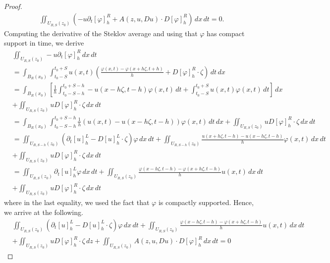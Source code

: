 \documentclass[10pt,a4paper]{amsart}
\numberwithin{equation}{section}
\begin{document}
\begin{proof}
\begin{align*}
&\iint_{U_{R, S}(z_0)}\left(-u\partial_{t}[\varphi]^R_{h}+A(z, u, Du)\cdot D[\varphi]^R_{h}\right)\, dx\, dt=0.
\end{align*}
Computing the derivative of the Steklov average and using that $\varphi$
has compact support in time, we derive
\begin{align*}
&\iint_{U_{R, S}(z_0)}-u\partial_{t}[\varphi]^R_{h} \,dx\, dt \\
& =\int_{B_{R}(x_0)}\int_{t_0-S}^{t_0+S}u(x,t)\left(\frac{\varphi(x,t)-\varphi(x+h\zeta,t+h)}{h}+D[\varphi]_{h}^{R}\cdot\zeta\right)\,dt\,dx\\
 & =\int_{B_{R}(x_0)}\left[\frac{1}{h}\int_{t_0-S-h}^{t_0+S-h}-u(x-h\zeta,t-h)\varphi(x,t)\,dt+\int_{t_0-S}^{t_0+S}u(x,t)\varphi(x,t)\,dt\right]\, dx\\
 &+\iint_{U_{R, S}(z_0)}uD[\varphi]^R_h\cdot \zeta \, dx\, dt\\
 & =\int_{B_{R}(x_0)}\int_{t_0-S-h}^{t_0+S-h}\frac{1}{h}(u(x,t)-u(x-h \zeta,t-h))\varphi(x,t)\, dt\, dx
 +\iint_{U_{R, S}(z_0)}uD[\varphi]^R_h\cdot \zeta \, dx\, dt\\
 & =\iint_{U_{R, S-h}(z_0)}\left(\partial_{t}[u]^L_{h}-D[u]^L_h\cdot \zeta\right)\varphi\,dx\, dt+\iint_{U_{R, S-h}(z_0)}\frac{u(x+h\zeta, t-h)-u(x-h\zeta, t-h)}{h}\varphi(x, t)\,dx\, dt\\
 &+\iint_{U_{R, S}(z_0)}uD[\varphi]^R_h\cdot \zeta \, dx\, dt\\
 &=\iint_{U_{R, S}(z_0)}\partial_{t}[u]^L_{h}\varphi\,dx\, dt+\iint_{U_{R, S}(z_0)}\frac{\varphi(x-h\zeta, t-h)-\varphi(x+h\zeta, t-h)}{h}u(x, t)\,dx\, dt\\
 &+\iint_{U_{R, S}(z_0)}uD[\varphi]^R_h\cdot \zeta \, dx\, dt
\end{align*}
where in the last equality, we used the fact that $\varphi$ is compactly supported.
Hence, we arrive at the following.
\begin{align}\label{weak formulation_1}
&\iint_{U_{R, S}(z_0)}\left(\partial_{t}[u]^L_{h}-D[u]^L_h\cdot \zeta\right)\varphi\,dx\, dt+\iint_{U_{R, S}(z_0)}\frac{\varphi(x-h\zeta, t-h)-\varphi(x+h\zeta, t-h)}{h}u(x, t)\,dx\, dt\nonumber\\
 &+\iint_{U_{R, S}(z_0)}uD[\varphi]^R_h\cdot \zeta \, dz+\iint_{U_{R, S}(z_0)}A(z, u, Du)\cdot D[\varphi]^R_{h}\,dx\, dt=0
\end{align}


\end{proof}
\end{document}
